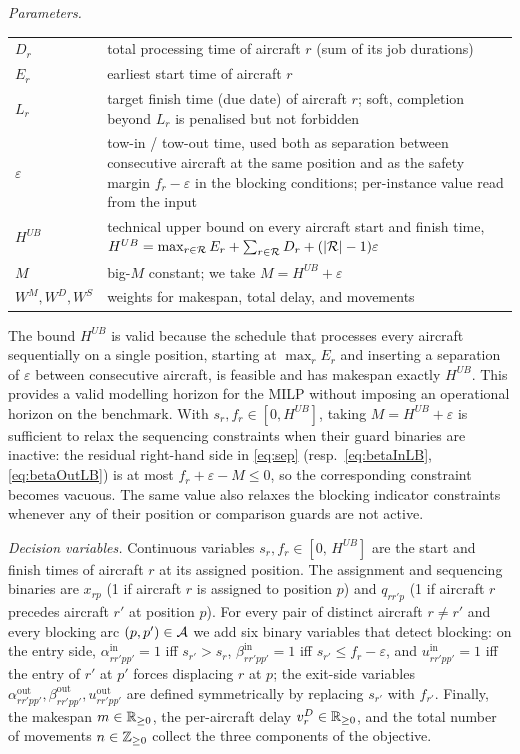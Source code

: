 \smallskip
\noindent\textit{Parameters.}
\begin{tabular}{@{}l@{\quad}p{}@{}}
  $D_r$
    & total processing time of aircraft $r$ (sum of its job durations) \\
  $E_r$
    & earliest start time of aircraft $r$ \\
  $L_r$
    & target finish time (due date) of aircraft $r$; soft, completion
      beyond $L_r$ is penalised but not forbidden \\
  $\varepsilon$
    & tow-in / tow-out time, used both as separation between consecutive
      aircraft at the same position and as the safety margin
      $f_r - \varepsilon$ in the blocking conditions; per-instance value
      read from the input \\
  $H^{UB}$
    & technical upper bound on every aircraft start and finish time,
      $H^{UB} = \max_{r \in \mathcal{R}} E_r + \sum_{r \in \mathcal{R}} D_r +
      (|\mathcal{R}| - 1)\varepsilon$ \\
  $M$
    & big-$M$ constant; we take $M = H^{UB} + \varepsilon$ \\
  $W^M, W^D, W^S$
    & weights for makespan, total delay, and movements \\
\end{tabular}

\smallskip
\noindent
The bound $H^{UB}$ is valid because the schedule that processes every
aircraft sequentially on a single position, starting at $\max_r E_r$ and
inserting a separation of $\varepsilon$ between consecutive aircraft, is
feasible and has makespan exactly $H^{UB}$.  This provides a valid
modelling horizon for the MILP without imposing an operational horizon
on the benchmark.  With $s_r, f_r \in [0, H^{UB}]$, taking $M = H^{UB} +
\varepsilon$ is sufficient to relax the sequencing constraints when
their guard binaries are inactive: the residual right-hand side in
\eqref{eq:sep} (resp.\ \eqref{eq:betaInLB}, \eqref{eq:betaOutLB}) is at
most $f_r + \varepsilon - M \le 0$, so the corresponding constraint
becomes vacuous.  The same value also relaxes the blocking indicator
constraints whenever any of their position or comparison guards are not
active.

\smallskip
\noindent\textit{Decision variables.}
Continuous variables $s_r, f_r \in [0,\, H^{UB}]$ are the start and
finish times of aircraft $r$ at its assigned position.  The assignment
and sequencing binaries are $x_{rp}$ (1 if aircraft $r$ is assigned to
position $p$) and $q_{rr'p}$ (1 if aircraft $r$ precedes aircraft $r'$ at
position $p$).  For every pair of distinct aircraft $r \ne r'$ and every
blocking arc $(p, p') \in \mathcal{A}$ we add six binary variables that detect
blocking: on the entry side, $\alpha^{\mathrm{in}}_{rr'pp'} = 1$ iff
$s_{r'} > s_r$, $\beta^{\mathrm{in}}_{rr'pp'} = 1$ iff
$s_{r'} \le f_r - \varepsilon$, and $u^{\mathrm{in}}_{rr'pp'} = 1$ iff the
entry of $r'$ at $p'$ forces displacing $r$ at $p$; the exit-side
variables $\alpha^{\mathrm{out}}_{rr'pp'}, \beta^{\mathrm{out}}_{rr'pp'},
u^{\mathrm{out}}_{rr'pp'}$ are defined symmetrically by replacing $s_{r'}$
with $f_{r'}$.  Finally, the makespan $m \in \mathbb{R}_{\geq 0}$, the per-aircraft delay
$v^D_r \in \mathbb{R}_{\geq 0}$, and the total number of movements $n \in \mathbb{Z}_{\geq 0}$ collect the
three components of the objective.

